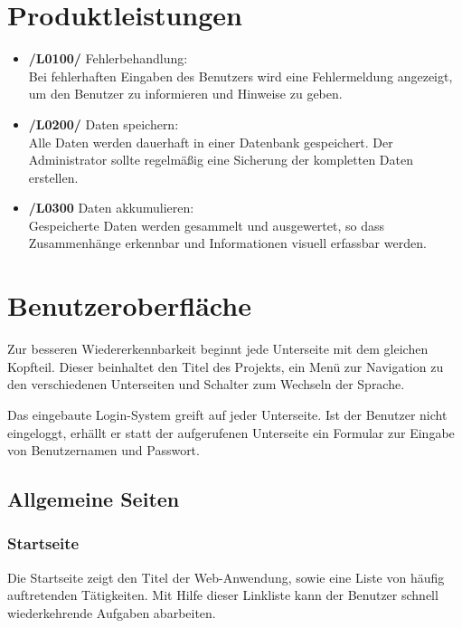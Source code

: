 \documentclass[a4paper,oneside]{scrreprt}
\begin{document}
\chapter{Produktleistungen}

\begin{itemize}
\item \textbf{/L0100/} Fehlerbehandlung: \\
Bei fehlerhaften Eingaben des Benutzers wird eine Fehlermeldung angezeigt, um den Benutzer zu informieren und Hinweise zu geben.

\item \textbf{/L0200/} Daten speichern: \\
Alle Daten werden dauerhaft in einer Datenbank gespeichert. Der Administrator sollte regelmäßig eine Sicherung der kompletten Daten erstellen.

\item \textbf{/L0300} Daten akkumulieren: \\
Gespeicherte Daten werden gesammelt und ausgewertet, so dass Zusammenhänge erkennbar und Informationen visuell erfassbar werden.
\end{itemize}


\chapter{Benutzeroberfläche}

Zur besseren Wiedererkennbarkeit beginnt jede Unterseite mit dem gleichen Kopfteil. Dieser beinhaltet den Titel des Projekts, ein Menü zur Navigation zu den verschiedenen Unterseiten und Schalter zum Wechseln der Sprache.

Das eingebaute Login-System greift auf jeder Unterseite. Ist der Benutzer nicht eingeloggt, erhällt er statt der aufgerufenen Unterseite ein Formular zur Eingabe von Benutzernamen und Passwort.

\section{Allgemeine Seiten}

\subsection*{Startseite}

Die Startseite zeigt den Titel der Web-Anwendung, sowie eine Liste von häufig auftretenden Tätigkeiten. Mit Hilfe dieser Linkliste kann der Benutzer schnell wiederkehrende Aufgaben abarbeiten.
\end{document}
